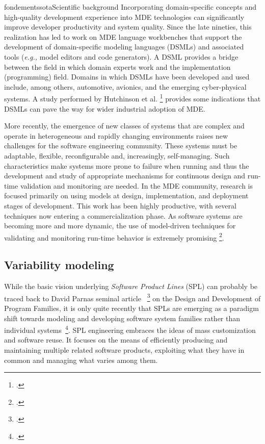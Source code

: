 \documentclass{ra2018}
\begin{document}
\begin{module}{fondements}{sota}{Scientific background}
Incorporating domain-specific concepts and high-quality development experience into MDE technologies can significantly improve developer productivity and system quality. Since the late nineties, this realization has led to work on MDE language workbenches that support the development of domain-specific modeling languages (DSMLs) and associated tools (\emph{e.g.,} model editors and code generators). A DSML provides a bridge between the field in which domain experts work and the implementation (programming) field. Domains in which DSMLs have been developed and used include, among others, automotive, avionics, and the emerging cyber-physical systems. A study performed by Hutchinson et al.   \footcite{Hutchinson11} provides some indications that DSMLs can pave the way for wider industrial adoption of MDE.

More recently, the emergence of new classes of systems that are complex and  operate in heterogeneous and rapidly changing environments raises new challenges for the software engineering community. These systems must be adaptable, flexible, reconfigurable and, increasingly, self-managing. Such characteristics make systems more prone to failure when running and thus the development and study of appropriate mechanisms for continuous design and run-time validation and monitoring are needed. In the MDE community, research is focused primarily on using models at design, implementation, and deployment stages of development. This work has been highly productive, with several techniques now entering a commercialization phase. As software systems are becoming more and more dynamic, the use of model-driven techniques for validating and monitoring run-time behavior
is extremely promising   \footcite{Morin09f}.



\subsection{Variability modeling}
\label{sec:variability}
While the basic vision underlying \textit{Software Product Lines} (SPL) can
probably be traced back to David Parnas seminal article~  \footcite{parnas1976} on
the Design and Development of Program Families, it is only quite recently that
SPLs are emerging as a paradigm shift towards modeling and developing
software system families rather than individual
systems~\footcite{Northrop1999}. SPL engineering embraces the ideas of mass
customization and software reuse. It focuses on the means of efficiently
producing and maintaining multiple related software products, exploiting what
they have in common and managing what varies among them.


\end{module}
\end{document}
